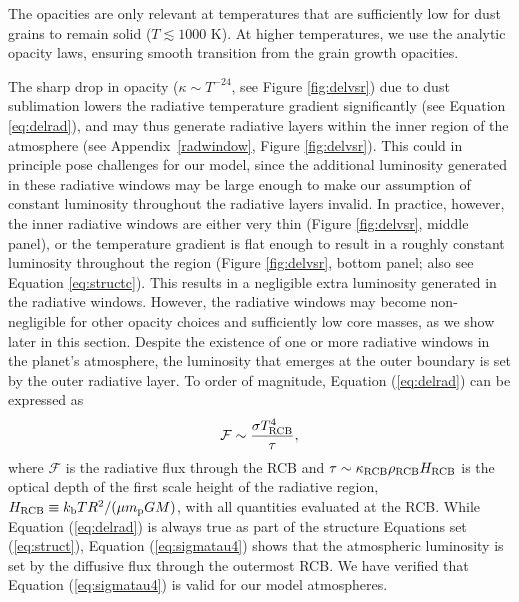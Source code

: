 \documentclass[apj]{emulateapj}
\newcommand{\App}[1]{Appendix~\ref{#1}}
\newcommand{\cb}{_{\rm RCB}}
\begin{document}
The \citet{dalessio01} opacities are only relevant at temperatures that are sufficiently low for dust grains to remain solid ($T \lesssim 1000$ K). At higher temperatures, we use the \citet{bell94} analytic opacity laws, ensuring smooth transition from the grain growth opacities. 

The sharp drop in opacity ($\kappa \sim T^{-24}$, see Figure \ref{fig:delvsr}) due to dust sublimation lowers the radiative temperature gradient significantly (see Equation \ref{eq:delrad}), and may thus generate radiative layers within the inner region of the atmosphere (see \App{radwindow}, Figure \ref{fig:delvsr}). This could in principle pose challenges for our model, since the additional luminosity generated in these radiative windows may be large enough to make our assumption of constant luminosity throughout the radiative layers invalid. In practice, however, the inner radiative windows are either very thin (Figure \ref{fig:delvsr}, middle panel), or the temperature gradient is flat enough to result in a roughly constant luminosity throughout the region (Figure \ref{fig:delvsr}, bottom panel; also see Equation \ref{eq:structc}). This results in a negligible extra luminosity generated in the radiative windows. However, the radiative windows may become non-negligible for other opacity choices and sufficiently low core masses, as we show later in this section. Despite the existence of one or more radiative windows in the planet's atmosphere, the luminosity that emerges at the outer boundary is set by the outer radiative layer. To order of magnitude, Equation (\ref{eq:delrad}) can be expressed as
\begin{equation}
\label{eq:sigmatau4}
\mathcal{F} \sim \frac{\sigma T\cb^4}{\tau},
\end{equation}
where $\mathcal{F}$ is the radiative flux through the RCB and $\tau \sim \kappa\cb \rho\cb H\cb$ is the optical depth of the first scale height of the radiative region, $H\cb \equiv k_{\rm b} T R^2/({\mu m_{\rm p}} G M)$, with all quantities evaluated at the RCB. While Equation (\ref{eq:delrad}) is always true as part of the structure Equations set (\ref{eq:struct}), Equation (\ref{eq:sigmatau4}) shows that the atmospheric luminosity is set by the diffusive flux through the outermost RCB. We have verified that Equation (\ref{eq:sigmatau4}) is valid for our model atmospheres.
\end{document}
